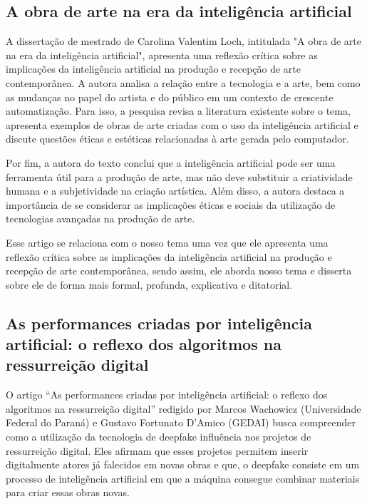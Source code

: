 \documentclass[12pt]{article}
\begin{document}
    \subsection{A obra de arte na era da inteligência artificial}
	\label{sec:trab_relacionados}

    A dissertação de mestrado de Carolina Valentim Loch, intitulada "A obra de arte na era da inteligência artificial", apresenta uma reflexão crítica sobre as implicações da inteligência artificial na produção e recepção de arte contemporânea. A autora analisa a relação entre a tecnologia e a arte, bem como as mudanças no papel do artista e do público em um contexto de crescente automatização. Para isso, a pesquisa revisa a literatura existente sobre o tema, apresenta exemplos de obras de arte criadas com o uso da inteligência artificial e discute questões éticas e estéticas relacionadas à arte gerada pelo computador. 
    
    Por fim, a autora do texto conclui que a inteligência artificial pode ser uma ferramenta útil para a produção de arte, mas não deve substituir a criatividade humana e a subjetividade na criação artística. Além disso, a autora destaca a importância de se considerar as implicações éticas e sociais da utilização de tecnologias avançadas na produção de arte.
    
    Esse artigo se relaciona com o nosso tema uma vez que ele apresenta uma reflexão crítica sobre as implicações da inteligência artificial na produção e recepção de arte contemporânea, sendo assim, ele aborda nosso tema e disserta sobre ele de forma mais formal, profunda, explicativa e ditatorial.


    \subsection{As performances criadas por inteligência artificial: o reflexo dos algoritmos na ressurreição digital}
	\label{sec:trab_relacionados}

    O artigo “As performances criadas por inteligência artificial: o reflexo dos algoritmos na ressurreição digital” redigido por Marcos Wachowicz (Universidade Federal do Paraná) e Gustavo Fortunato D'Amico (GEDAI) busca compreender como a utilização  da  tecnologia  de  deepfake influência nos projetos de ressurreição digital. Eles afirmam que esses projetos permitem inserir digitalmente atores já falecidos em novas obras e que, o deepfake consiste em um processo de inteligência artificial em  que  a  máquina  consegue  combinar  materiais  para  criar essas obras  novas.  
    
\end{document}
